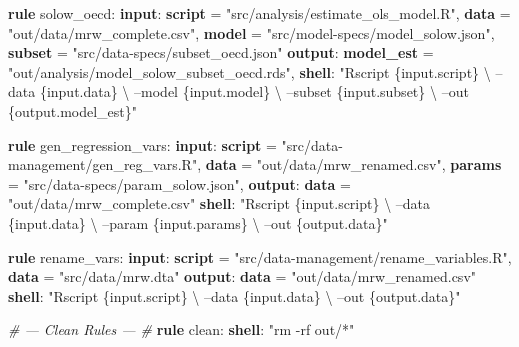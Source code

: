 \documentclass[]{book}
\newenvironment{Shaded}{\begin{snugshade}}{\end{snugshade}}
\newcommand{\KeywordTok}[1]{\textcolor[rgb]{0.13,0.29,0.53}{\textbf{{#1}}}}
\newcommand{\StringTok}[1]{\textcolor[rgb]{0.31,0.60,0.02}{{#1}}}
\newcommand{\CommentTok}[1]{\textcolor[rgb]{0.56,0.35,0.01}{\textit{{#1}}}}
\newcommand{\NormalTok}[1]{{#1}}
\theoremstyle{definition}
\theoremstyle{definition}
\theoremstyle{definition}
\theoremstyle{remark}
\begin{document}
\begin{Shaded}
\begin{Highlighting}[]
\KeywordTok{rule} \NormalTok{solow_oecd:}
    \KeywordTok{input}\NormalTok{:}
        \KeywordTok{script} \NormalTok{= }\StringTok{"src/analysis/estimate_ols_model.R"}\NormalTok{,}
        \KeywordTok{data}   \NormalTok{= }\StringTok{"out/data/mrw_complete.csv"}\NormalTok{,}
        \KeywordTok{model}  \NormalTok{= }\StringTok{"src/model-specs/model_solow.json"}\NormalTok{,}
        \KeywordTok{subset} \NormalTok{= }\StringTok{"src/data-specs/subset_oecd.json"}
    \KeywordTok{output}\NormalTok{:}
        \KeywordTok{model_est} \NormalTok{= }\StringTok{"out/analysis/model_solow_subset_oecd.rds"}\NormalTok{,}
    \KeywordTok{shell}\NormalTok{:}
        \StringTok{"Rscript \{input.script\} \textbackslash{}}
\StringTok{            --data \{input.data\} \textbackslash{}}
\StringTok{            --model \{input.model\} \textbackslash{}}
\StringTok{            --subset \{input.subset\} \textbackslash{}}
\StringTok{            --out \{output.model_est\}"}

\KeywordTok{rule} \NormalTok{gen_regression_vars:}
    \KeywordTok{input}\NormalTok{:}
        \KeywordTok{script} \NormalTok{= }\StringTok{"src/data-management/gen_reg_vars.R"}\NormalTok{,}
        \KeywordTok{data}   \NormalTok{= }\StringTok{"out/data/mrw_renamed.csv"}\NormalTok{,}
        \KeywordTok{params} \NormalTok{= }\StringTok{"src/data-specs/param_solow.json"}\NormalTok{,}
    \KeywordTok{output}\NormalTok{:}
        \KeywordTok{data} \NormalTok{= }\StringTok{"out/data/mrw_complete.csv"}
    \KeywordTok{shell}\NormalTok{:}
        \StringTok{"Rscript \{input.script\} \textbackslash{}}
\StringTok{            --data \{input.data\} \textbackslash{}}
\StringTok{            --param \{input.params\} \textbackslash{}}
\StringTok{            --out \{output.data\}"}

\KeywordTok{rule} \NormalTok{rename_vars:}
    \KeywordTok{input}\NormalTok{:}
        \KeywordTok{script} \NormalTok{= }\StringTok{"src/data-management/rename_variables.R"}\NormalTok{,}
        \KeywordTok{data}   \NormalTok{= }\StringTok{"src/data/mrw.dta"}
    \KeywordTok{output}\NormalTok{:}
        \KeywordTok{data} \NormalTok{= }\StringTok{"out/data/mrw_renamed.csv"}
    \KeywordTok{shell}\NormalTok{:}
        \StringTok{"Rscript \{input.script\} \textbackslash{}}
\StringTok{            --data \{input.data\} \textbackslash{}}
\StringTok{            --out \{output.data\}"}

\CommentTok{# --- Clean Rules --- #}
\KeywordTok{rule} \NormalTok{clean:}
    \KeywordTok{shell}\NormalTok{:}
        \StringTok{"rm -rf out/*"}
\end{Highlighting}
\end{Shaded}
\end{document}
